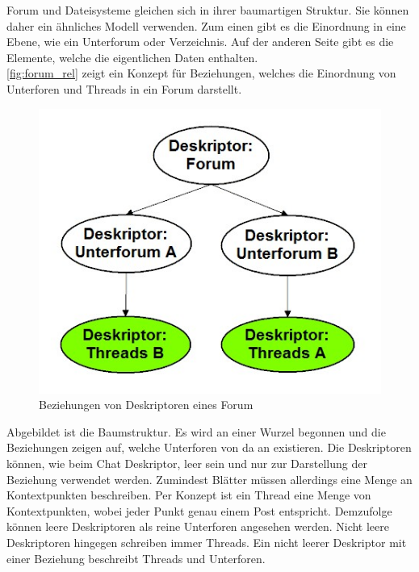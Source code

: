 \documentclass[a4paper]{article}
\begin{document}
	Forum und Dateisysteme gleichen sich in ihrer baumartigen Struktur. Sie können
	daher ein ähnliches Modell verwenden. Zum einen gibt es die Einordnung
	in eine Ebene, wie ein Unterforum oder Verzeichnis. Auf der anderen
	Seite gibt es die Elemente, welche die eigentlichen Daten enthalten. \\
	
	\autoref{fig:forum_rel} zeigt ein Konzept für Beziehungen, welches die
	Einordnung von Unterforen und Threads in ein Forum darstellt.
	
	\begin{figure}[H]
		\centerline{
			\includegraphics[scale=0.65]{../Bilder/forum_rel.jpg}
		}
		\caption{Beziehungen von Deskriptoren eines Forum}
		\label{fig:forum_rel}
	\end{figure}
	
	Abgebildet ist die Baumstruktur. Es wird an einer Wurzel begonnen und
	die Beziehungen zeigen auf, welche Unterforen von da an existieren. Die
	Deskriptoren können, wie beim Chat Deskriptor, leer sein und nur zur
	Darstellung der Beziehung verwendet werden. Zumindest Blätter müssen
	allerdings eine Menge an Kontextpunkten beschreiben. Per Konzept ist ein Thread 
	eine Menge von Kontextpunkten, wobei jeder Punkt genau einem Post entspricht.
	Demzufolge können leere Deskriptoren als reine Unterforen angesehen werden.
	Nicht leere Deskriptoren hingegen schreiben immer Threads. Ein nicht
	leerer Deskriptor mit einer Beziehung beschreibt Threads und Unterforen. \\
	
\end{document}

